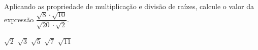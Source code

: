Aplicando as propriedade de multiplicação e divisão de raízes, calcule o valor da expressão $\dfrac{\sqrt{8}\cdot \sqrt{10}}{\sqrt{20}\cdot\sqrt{2}}$.

$\sqrt{2}$
$\sqrt{3}$
$\sqrt{5}$
$\sqrt{7}$
$\sqrt{11}$



